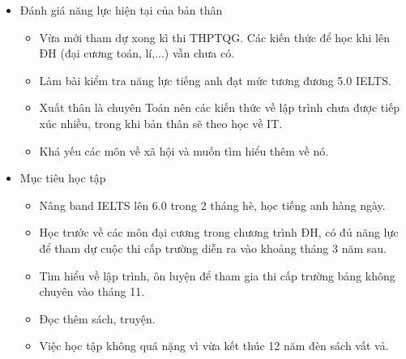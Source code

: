 \begin{itemize}
    \item Đánh giá năng lực hiện tại của bản thân
    \begin{itemize}
        \item Vừa mới tham dự xong kì thi THPTQG. Các kiến thức để học khi lên ĐH (đại cương toán, lí,...) vẫn chưa có.
        \item Làm bài kiểm tra năng lực tiếng anh đạt mức tương đương 5.0 IELTS.
        \item Xuất thân là chuyên Toán nên các kiến thức về lập trình chưa được tiếp xúc nhiều, trong khi bản thân sẽ theo học về IT.
        \item Khá yếu các môn về xã hội và muốn tìm hiểu thêm về nó.
    \end{itemize}
    \item Mục tiêu học tập
    \begin{itemize}
        \item Nâng band IELTS lên 6.0 trong 2 tháng hè, học tiếng anh hàng ngày.
        \item Học trước về các môn đại cương trong chương trình ĐH, có đủ năng lực để tham dự cuộc thi cấp trường diễn ra vào khoảng tháng 3 năm sau.
        \item Tìm hiểu về lập trình, ôn luyện để tham gia thi cấp trường bảng không chuyên vào tháng 11.
        \item Đọc thêm sách, truyện.
        \item Việc học tập không quá nặng vì vừa kết thúc 12 năm đèn sách vất vả.
    \end{itemize}
\end{itemize}
